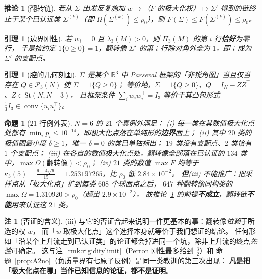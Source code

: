 \documentclass[UTF8,11pt]{ctexart}
\newtheorem{proposition}[theorem]{命题}
\newtheorem{lemma}[theorem]{引理}
\newtheorem{corollary}[theorem]{推论}
\theoremstyle{definition}
\newtheorem{remark}[theorem]{注}
\newcommand{\R}{\mathbb{R}}
\begin{document}
\begin{corollary}[翻转链]\label{cor:flipsc}
若从 $\Sigma$ 出发反复施加 $w\mapsto$（$F$ 的极大化权）$\mapsto\Sigma'$ 得到的链终止于某个已认证类
$\Sigma^{(k)}$（即 $\Omega(\Sigma^{(k)})\le\rho_0$），则 $F(\Sigma)\le F(\Sigma^{(k)})\le\rho_0$。
\end{corollary}

\begin{lemma}[边界刚性]\label{lem:bdryrig}
若 $w_i=0$ 且 $\lambda_3(M)>0$，则 $\Pi_3(M)$ 的第 $i$ 行\textbf{恰好}为零行，
于是按约定 $1\{0\ge0\}=1$，翻转像 $\Sigma'$ 的第 $i$ 行除对角外全为 $1$，即 $i$ 成为 $\Sigma'$ 的支配点。
\end{lemma}

\begin{lemma}[腔的几何刻画]\label{lem:chamber}
$\Sigma$ 是某个 $\R^3$ 中 Parseval 框架的「非锐角图」当且仅当存在 $Q\in\mathcal P_3(N)$ 使 $\Sigma=1\{Q\ge0\}$；
等价地，$\Sigma=1\{Q\ge0\}$、$Q=I_N-ZZ^\top$、$Z\in\mathrm{St}(N,N-3)$，
且框架条件 $\sum_iw_iw_i^\top=I_3$ 等价于其凸包形式 $\frac13I_3\in\operatorname{conv}\{u_iu_i^\top\}$。
\end{lemma}

\begin{proposition}[$21$ 行例外表]\label{prop:kappa6red}
$N=6$ 的 $21$ 个真例外满足：
(i) 每一类在其数值极大化点处都有 $\min_ip_i\le10^{-14}$，即极大化点落在单纯形的\textbf{边界}面上；
(ii) 其中 $20$ 类的极值图最小度 $\delta\ge1$，唯一 $\delta=0$ 的类已单独标出；
$19$ 类没有支配点、$2$ 类恰有 $1$ 个支配点；
(iii) 在各自的数值极大化点处，翻转像全部落在已认证的 $134$ 类中，$\max\Omega(\text{翻转像})<\rho_0$；
(iv) $21$ 类的数值 $\max F$ 均等于 $\kappa_3(5)=\frac{9+4\sqrt6}{15}=1.253197265$，比 $\rho_0$ 低 $2.84\times10^{-2}$。
\textbf{但}(iii) 不能推广：把采样点从「极大化点」扩到每类 $608$ 个球面点之后，
$647$ 种翻转像同构类的 $\max\Omega=1.310920>\rho_0$（超出 $2.9\times10^{-2}$），
故推论~\ref{cor:flipsc} 的前提\textbf{不成立}，翻转链\textbf{不能}用来认证这 $21$ 类。
\end{proposition}

\begin{remark}[否证的含义]\label{rmk:flipdead}
(iii) 与它的否证合起来说明一件更基本的事：翻转像\emph{依赖}于所选的权 $w$，
而「$w$ 取极大化点」这个选择本身就等价于我们想证的结论。
任何形如「沿某个上升流走到已认证类」的论证都会掉进同一个坑，除非上升流的终点\emph{先验}可确定。
这与注~\ref{rmk:rigiditylimit}（Perron 刚性最多给到 $\frac32$）和
命题~\ref{prop:A2no}（负质量界有七原子反例）是同一类教训的第三次出现：
\textbf{凡是把「极大化点在哪」当作已知信息的论证，都不是证明}。
\end{remark}
\end{document}
